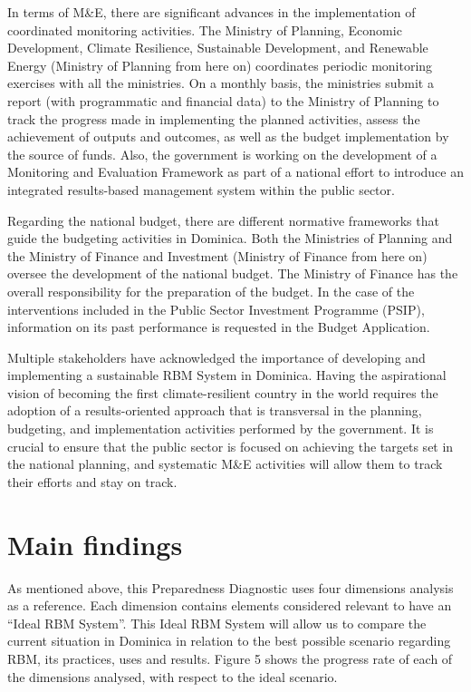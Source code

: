 \documentclass[
  10pt,
]{book}
\begin{document}
In terms of M\&E, there are significant advances in the implementation of coordinated monitoring activities. The Ministry of Planning, Economic Development, Climate Resilience, Sustainable Development, and Renewable Energy (Ministry of Planning from here on) coordinates periodic monitoring exercises with all the ministries. On a monthly basis, the ministries submit a report (with programmatic and financial data) to the Ministry of Planning to track the progress made in implementing the planned activities, assess the achievement of outputs and outcomes, as well as the budget implementation by the source of funds. Also, the government is working on the development of a Monitoring and Evaluation Framework as part of a national effort to introduce an integrated results-based management system within the public sector.

Regarding the national budget, there are different normative frameworks that guide the budgeting activities in Dominica. Both the Ministries of Planning and the Ministry of Finance and Investment (Ministry of Finance from here on) oversee the development of the national budget. The Ministry of Finance has the overall responsibility for the preparation of the budget. In the case of the interventions included in the Public Sector Investment Programme (PSIP), information on its past performance is requested in the Budget Application.

Multiple stakeholders have acknowledged the importance of developing and implementing a sustainable RBM System in Dominica. Having the aspirational vision of becoming the first climate-resilient country in the world requires the adoption of a results-oriented approach that is transversal in the planning, budgeting, and implementation activities performed by the government. It is crucial to ensure that the public sector is focused on achieving the targets set in the national planning, and systematic M\&E activities will allow them to track their efforts and stay on track.

\hypertarget{section5}{%
\chapter{Main findings}\label{section5}}

As mentioned above, this Preparedness Diagnostic uses four dimensions analysis as a reference. Each dimension contains elements considered relevant to have an ``Ideal RBM System''. This Ideal RBM System will allow us to compare the current situation in Dominica in relation to the best possible scenario regarding RBM, its practices, uses and results. Figure 5 shows the progress rate of each of the dimensions analysed, with respect to the ideal scenario.
\end{document}
